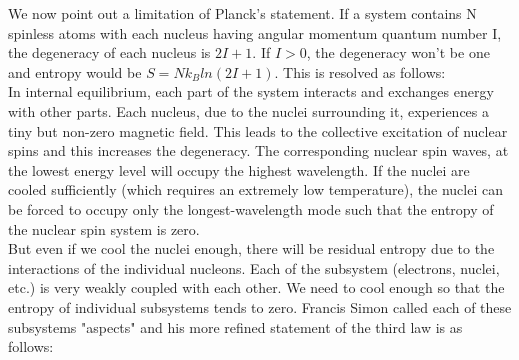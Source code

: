 \documentclass{article}
\begin{document}
	We now point out a limitation of Planck's statement. If a system contains N spinless atoms with each nucleus having angular momentum quantum number I, the degeneracy of each nucleus is $2I+1$. If $I>0$, the degeneracy won't be one and entropy would be $S = Nk_Bln(2I+1)$. This is resolved as follows:\\
	
	In internal equilibrium, each part of the system interacts and exchanges energy with other parts. Each nucleus, due to the nuclei surrounding it, experiences a tiny but non-zero magnetic field. This leads to the collective excitation of nuclear spins and this increases the degeneracy. The corresponding nuclear spin waves, at the lowest energy level will occupy the highest wavelength. If the nuclei are cooled sufficiently (which requires an extremely low temperature), the nuclei can be forced to occupy only the longest-wavelength mode such that the entropy of the nuclear spin system is zero.\\
	
	But even if we cool the nuclei enough, there will be residual entropy due to the interactions of the individual nucleons. Each of the subsystem (electrons, nuclei, etc.) is very weakly coupled with each other. We need to cool enough so that the entropy of individual subsystems tends to zero. Francis Simon called each of these subsystems "aspects" and his more refined statement of the third law is as follows:\\
	
	\noindent{}
\end{document}
